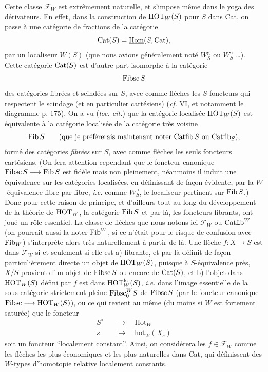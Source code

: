 Cette classe $\mathcal{F}_W$ est extrêmement naturelle, et s'impose même dans le yoga des dérivateurs. En effet, dans la construction de $\mathrm{HOT}_W(S)$ pour $S$ dans Cat, on passe à une catégorie de fractions de la catégorie
\[
\mathrm{Cat}(S) = \underline{\mathrm{Hom}}(S, \mathrm{Cat}),
\]
par un localiseur $W(S)$ (que nous avions généralement noté $W_S^{\mathrm{g}}$ ou $W_S^{\mathrm{u}}$ \ldots). Cette catégorie $\mathrm{Cat}(S)$ est d'autre part isomorphe à la catégorie
\[
\mathrm{Fibsc}\, S
\]
des catégories fibrées et scindées sur $S$, avec comme flèches les $S$-foncteurs qui respectent le scindage (et en particulier cartésiens) (\textit{cf.} VI, et notamment le diagramme p. 175). On a vu (\textit{loc. cit.}) que la catégorie localisée $\mathrm{HOT}_W(S)$ est équivalente à la catégorie localisée de la catégorie très voisine
\[
\mathrm{Fib}\, S \qquad \text{(que je préférerais maintenant noter $\mathrm{Catfib}\, S$ ou $\mathrm{Catfib}_S$),}
\]
formé des catégories \textit{fibrées} sur $S$, avec comme  flèches les seuls foncteurs cartésiens. (On fera attention cependant que le foncteur canonique $\mathrm{Fibsc}\, S \longrightarrow \mathrm{Fib}\, S$ est fidèle mais non pleinement, néanmoins il induit une équivalence sur les catégories localisées, en définissant de façon évidente, par la $W$-équivalence fibre par fibre, \textit{i.e.} comme $W_S^{\mathrm{u}}$, le localiseur pertinent sur $\mathrm{Fib}\, S$.) Donc pour cette raison de principe, et d'ailleurs tout au long du développement de la théorie de $\mathrm{HOT}_W$, la catégorie $\mathrm{Fib}\, S$ et par là, les foncteurs fibrants, ont joué un rôle essentiel. La classe de flèches que nous notons ici $\mathcal{F}_W$ ou $\mathrm{Catfib}^W$ (on pourrait aussi la noter $\mathrm{Fib}^W$, si ce n'était pour le risque de confusion avec $\mathrm{Fib}_W$) s'interprète alors très naturellement à partir de là. Une flèche $f : X \longrightarrow S$ est dans $\mathcal{F}_W$ si et seulement si elle est a) fibrante, et par là définit de façon particulièrement directe un objet de $\mathrm{HOT}_W(S)$, puisque à $S$-équivalence près, $X/S$ provient d'un objet de $\mathrm{Fibsc}\, S$ ou encore de $\mathrm{Cat}(S)$,  et b) l'objet dans $\mathrm{HOT}_W(S)$ défini par $f$ est dans $\mathrm{HOT}_W^{\mathrm{lc}}(S)$, \textit{i.e.} dans l'image essentielle de la sous-catégorie strictement pleine $\mathrm{Fibsc}_0^W S$ de $\mathrm{Fibsc}\, S$ (par le foncteur canonique
$\mathrm{Fibsc} \longrightarrow \mathrm{HOT}_W(S)$), ou ce qui revient au même (du moins si $W$ est fortement saturée) que le foncteur %
\[
\begin{aligned}
S^{\circ} \quad &\longrightarrow \quad \mathrm{Hot}_W \\
s \quad &\longmapsto \quad \mathrm{hot}_W(X_s)
\end{aligned}
\]
soit un foncteur “localement constant”. Ainsi, on considérera les $f \in \mathcal{F}_W$ comme les flèches les plus économiques et les plus naturelles dans Cat, qui définissent des $W$-types d'homotopie relative localement constants.

